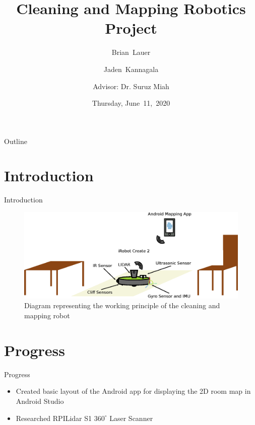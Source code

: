 \documentclass{beamer}
\title[Progress Update]{Cleaning and Mapping Robotics Project}
\author[B.~Lauer, J.~Kannagala]{Brian~Lauer \and Jaden~Kannagala \\\and
Advisor: Dr. Suruz Miah}
\institute[Bradley University] %
{
  Department of Electrical and Computer Engineering\\
  Bradley University\\
  1501 W. Bradley Avenue\\
  Peoria, IL, 61625, USA
}
\date[June~11,~2020]{Thursday, June~11,~2020}
\begin{document}
\begin{frame}
  \titlepage
\end{frame}

\begin{frame}{Outline}
  \tableofcontents
\end{frame}

\section{Introduction}
\begin{frame}{Introduction}{}
\begin{figure}
    \centering
    \includegraphics[scale=0.45]{figs/inkscape/mappingRobotArchitecture.eps}
    \caption{Diagram representing the working principle of the cleaning and mapping robot}
    \label{fig:my_label}
\end{figure}
\end{frame}

\section{Progress}

\begin{frame}{Progress}{}
    \begin{itemize}
        \item Created basic layout of the Android app for displaying the 2D room map in Android Studio
        \item Researched RPILidar S1 $360^\circ$ Laser Scanner
    \end{itemize}
\end{frame}
\end{document}
